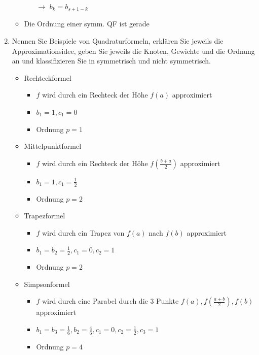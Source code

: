 \documentclass[]{article}
\begin{document}
\begin{enumerate}
\begin{itemize}
\begin{itemize}
						\item[$\rightarrow$] $b_k = b_{s+1-k}$
					\end{itemize}
				\item Die Ordnung einer symm. QF ist gerade	
			\end{itemize}
		\item Nennen Sie Beispiele von Quadraturformeln, erklären Sie jeweils die Approximationsidee, geben Sie jeweils die Knoten, Gewichte und die Ordnung an und klassifizieren Sie in symmetrisch und nicht symmetrisch.
			\begin{itemize}
				\item Rechteckformel
					\begin{itemize}
						\item $f$ wird durch ein Rechteck der Höhe $f(a)$ approximiert
						\item $b_1 = 1, c_1 = 0$
						\item Ordnung $p = 1$
					\end{itemize}
				\item Mittelpunktformel
					\begin{itemize}
						\item $f$ wird durch ein Rechteck der Höhe $f(\frac{b+a}{2})$ approximiert
						\item $b_1 = 1, c_1 = \frac{1}{2}$
						\item Ordnung $p = 2$
					\end{itemize}
				\item Trapezformel
					\begin{itemize}
						\item $f$ wird durch ein Trapez von $f(a)$ nach $f(b)$ approximiert
						\item $b_1 = b_2 = \frac{1}{2}, c_1 = 0, c_2 = 1$
						\item Ordnung $p = 2$
					\end{itemize}
				\item Simpsonformel
					\begin{itemize}
						\item $f$ wird durch eine Parabel durch die 3 Punkte $f(a), f(\frac{a+b}{2}), f(b)$ approximiert
						\item $b_1 = b_3 = \frac{1}{6}, b_2 = \frac{4}{6}, c_1 = 0, c_2 = \frac{1}{2}, c_3 = 1$
						\item Ordnung $p = 4$
					\end{itemize}
			\end{itemize}
	\end{enumerate}
\end{document}
